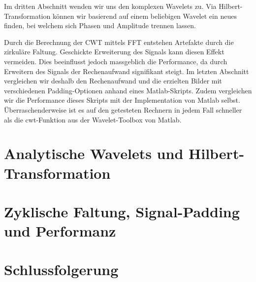 \begin{refsection}
Im dritten Abschnitt wenden wir uns den komplexen Wavelets zu.
Via Hilbert-Transformation können wir basierend auf einem beliebigen Wavelet ein neues finden, bei welchem sich Phasen und Amplitude trennen lassen.

Durch die Berechnung der CWT mittels FFT entstehen Artefakte durch die zirkuläre Faltung.
Geschickte Erweiterung des Signals kann diesen Effekt vermeiden.
Dies beeinflusst jedoch massgeblich die Performance, da durch Erweitern des Signals der Rechenaufwand signifikant steigt.
Im letzten Abschnitt vergleichen wir deshalb den Rechenaufwand und die erzielten Bilder mit verschiedenen Padding-Optionen anhand eines Matlab-Skripts.
Zudem vergleichen wir die Performance dieses Skripts mit der Implementation von Matlab selbst.
Überraschenderweise ist es auf den getesteten Rechnern in jedem Fall schneller als die cwt-Funktion aus der Wavelet-Toolbox von Matlab.





\section{Analytische Wavelets und Hilbert-Transformation}




\section{Zyklische Faltung, Signal-Padding und Performanz}
\label{complex:circ-conv-padding}

\section{Schlussfolgerung}

\printbibliography[heading=subbibliography]
\end{refsection}
